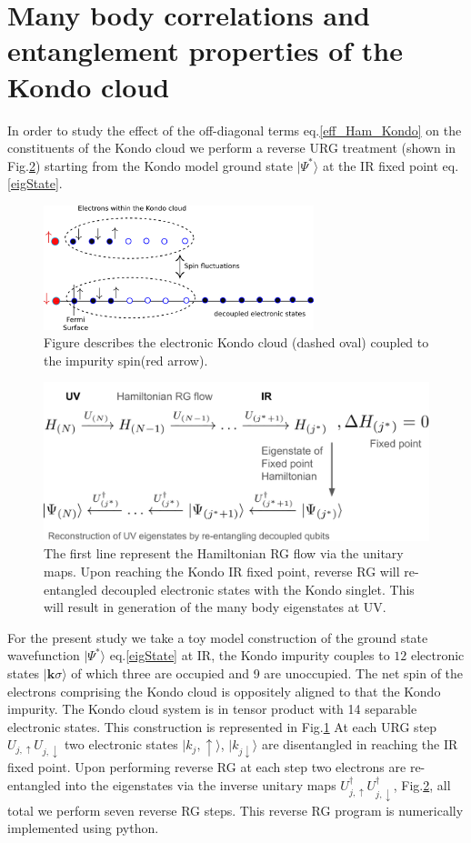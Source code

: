 \documentclass[aps,prb,preprint,groupedaddress]{revtex4-2}
\begin{document}
\section{Many body correlations and entanglement properties of the Kondo cloud}\label{ent2}
In order to study the effect of the off-diagonal terms  eq.\eqref{eff_Ham_Kondo} on the constituents of the Kondo cloud we perform a reverse URG treatment (shown in Fig.\ref{URGflowScheme}) starting from the Kondo model ground state $|\Psi^{*}\rangle$ at the IR fixed point eq.\eqref{eigState}.
\begin{figure}[!ht]
\centering
\includegraphics[width=0.7\textwidth]{KC.png}
\caption{Figure describes the electronic Kondo cloud (dashed oval) coupled to the impurity spin(red arrow).}\label{ToyKondo}
\end{figure}
\begin{figure}[!ht]
\includegraphics[width=\textwidth]{flowChart.png}
\caption{The first line represent the Hamiltonian RG flow via the unitary maps. Upon reaching the Kondo IR fixed point, reverse RG will re-entangled decoupled electronic states with the Kondo singlet. This will result in generation of the many body eigenstates at UV.}  \label{URGflowScheme}
\end{figure}
\pin
For the present study we take a toy model construction of the ground state wavefunction $|\Psi^{*}\rangle$ eq.\eqref{eigState} at IR, the Kondo impurity couples to $12$ electronic states $|\mathbf{k}\sigma\rangle$ of which three are occupied and 9 are unoccupied. The net spin of the electrons comprising the Kondo cloud is oppositely aligned to that the Kondo impurity. The Kondo cloud system is in tensor product with 14 separable electronic states. This construction is represented in Fig.\ref{ToyKondo} At each URG step $U_{j,\uparrow}U_{j,\downarrow}$ two electronic states $|k_{j},\uparrow\rangle$, $|k_{j\downarrow}\rangle$ are disentangled in reaching the IR fixed point. Upon performing reverse RG at each step two electrons are re-entangled into the eigenstates via the inverse unitary maps $U^{\dagger}_{j,\uparrow}U^{\dagger}_{j,\downarrow}$, Fig.\ref{URGflowScheme}, all total we perform seven reverse RG steps. This reverse RG program is numerically implemented using python. 
\end{document}
